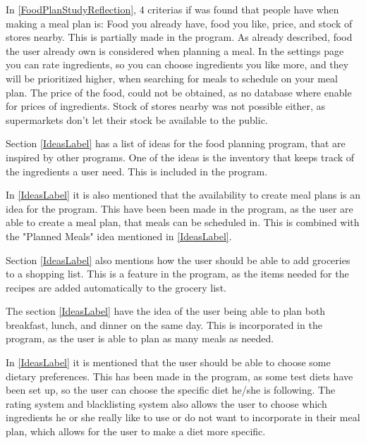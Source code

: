 In \cref{FoodPlanStudyReflection}, 4 criterias if was found that people have when making a meal plan is: Food you already have, food you like, price, and stock of stores nearby. This is partially made in the program. As already described, food the user already own is considered when planning a meal. In the settings page you can rate ingredients, so you can choose ingredients you like more, and they will be prioritized higher, when searching for meals to schedule on your meal plan. The price of the food, could not be obtained, as no database where enable for prices of ingredients. Stock of stores nearby was not possible either, as supermarkets don't let their stock be available to the public.

Section \ref{IdeasLabel} has a list of ideas for the food planning program, that are inspired by other programs. One of the ideas is the inventory that keeps track of the ingredients a user need. This is included in the program. 

In \cref{IdeasLabel} it is also mentioned that the availability to create meal plans is an idea for the program. This have been been made in the program, as the user are able to create a meal plan, that meals can be scheduled in. This is combined with the "Planned Meals" idea mentioned in \cref{IdeasLabel}.

Section \ref{IdeasLabel} also mentions how the user should be able to add groceries to a shopping list. This is a feature in the program, as the items needed for the recipes are added automatically to the grocery list.

The section \ref{IdeasLabel} have the idea of the user being able to plan both breakfast, lunch, and dinner on the same day. This is incorporated in the program, as the user is able to plan as many meals as needed.

In \cref{IdeasLabel} it is mentioned that the user should be able to choose some dietary preferences. This has been made in the program, as some test diets have been set up, so the user can choose the specific diet he/she is following. The rating system and blacklisting system also allows the user to choose which ingredients he or she really like to use or do not want to incorporate in their meal plan, which allows for the user to make a diet more specific.

